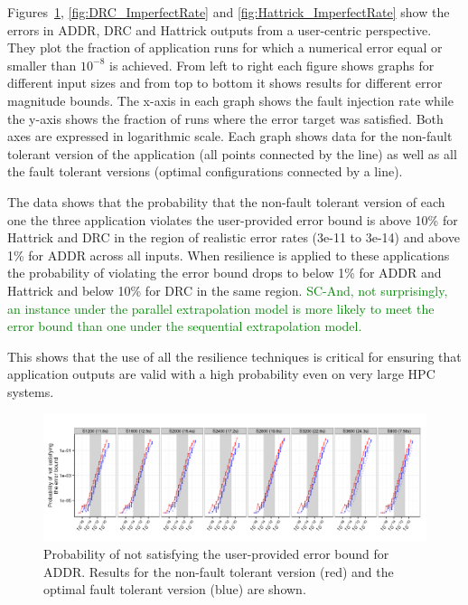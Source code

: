\documentclass[10pt, conference, compsocconf]{IEEEtran}
\newcommand{\sui}[1]{%
  \textcolor{green}{SC-#1}
}
\begin{document}
Figures~\ref{fig:Lasso_ImperfectRate}, \ref{fig:DRC_ImperfectRate} and \ref{fig:Hattrick_ImperfectRate} show the errors in ADDR, DRC and Hattrick outputs from a user-centric perspective.
They plot the fraction of application runs for which a numerical error equal or smaller than $10^{-8}$ is achieved.
From left to right each figure shows graphs for different input sizes and from top to bottom it shows results for different error magnitude bounds.
The x-axis in each graph shows the fault injection rate while the y-axis shows the fraction of runs where the error target was satisfied.
Both axes are expressed in logarithmic scale.
Each graph shows data for the non-fault tolerant version of the application (all points connected by the line) as well as all the fault tolerant versions (optimal configurations connected by a line).

The data shows that the probability that the non-fault tolerant version of each one the three application violates the user-provided error bound is above 10\% for Hattrick and DRC in the region of realistic error rates (3e-11 to 3e-14) and above 1\% for ADDR across all inputs.
When resilience is applied to these applications the probability of violating the error bound drops to below 1\% for ADDR and Hattrick and below 10\% for DRC in the same region.
\sui{And, not surprisingly, an instance under the parallel extrapolation model is more likely to meet the error bound than one under the sequential extrapolation model.}
This shows that the use of all the resilience techniques is critical for ensuring that application outputs are valid with a high probability even on very large HPC systems.


\begin{figure}[ht!]
\centering
\includegraphics[width=7in]{figs/Lasso_Par_Seq_ImperfectRate_log.png}
\vspace{-10pt}
\caption{Probability of not satisfying the user-provided error bound for ADDR. Results for the non-fault tolerant version (red) and the optimal fault tolerant version (blue) are shown.}
\vspace{-10pt}
\label{fig:Lasso_ImperfectRate}
\end{figure}
\end{document}
